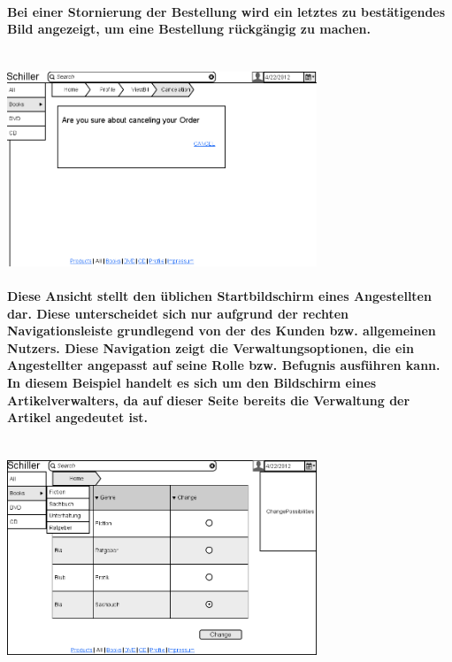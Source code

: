 \documentclass[a4paper]{article}
\begin{document}
\paragraph{Bei einer Stornierung der Bestellung wird ein letztes zu bestätigendes Bild angezeigt, um eine Bestellung rückgängig zu machen.\\ \\}
\includegraphics[width=350px]{13Cancelation.png}

\paragraph{Diese Ansicht stellt den üblichen Startbildschirm eines Angestellten dar. Diese unterscheidet sich nur aufgrund der rechten Navigationsleiste grundlegend von der des Kunden bzw. allgemeinen Nutzers. Diese Navigation zeigt die Verwaltungsoptionen, die ein Angestellter angepasst auf seine Rolle bzw. Befugnis ausführen kann.\\
In diesem Beispiel handelt es sich um den Bildschirm eines Artikelverwalters, da auf dieser Seite bereits die Verwaltung der Artikel angedeutet ist.\\ \\}
\includegraphics[width=350px]{14Home_Employee.png}
\end{document}
